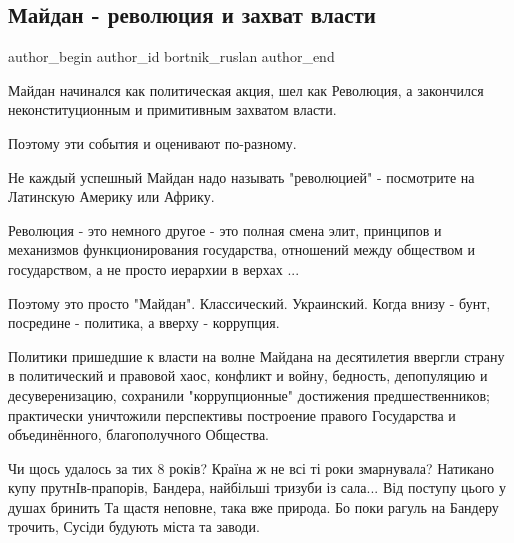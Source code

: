 
 
 
 
 
 
\subsection{Майдан - революция и захват власти}
\label{sec:21_11_2021.fb.bortnik_ruslan.1.maidan_revolucia_zahvat_vlasti}
 
\ifcmt
 author_begin
   author_id bortnik_ruslan
 author_end
\fi

Майдан начинался как политическая акция, шел как Революция, а закончился
неконституционным и примитивным захватом власти. 

Поэтому эти события и оценивают по-разному.  

Не каждый успешный Майдан надо называть "революцией" - посмотрите на Латинскую
Америку или Африку.

Революция - это немного другое - это полная смена элит, принципов и механизмов
функционирования государства, отношений между обществом и государством, а не
просто иерархии в верхах ...

Поэтому это просто "Майдан". Классический. Украинский. Когда внизу - бунт,
посредине  - политика, а вверху - коррупция. 

Политики пришедшие к власти на волне Майдана на десятилетия ввергли страну в
политический  и правовой хаос, конфликт и войну, бедность, депопуляцию и
десуверенизацию, сохранили "коррупционные" достижения предшественников;
практически уничтожили перспективы построение правого Государства и
объединённого, благополучного Общества.

\begin{cmtfront}

\begin{multicols}{2}
\obeycr
Чи щось удалось за тих 8 років?
Країна ж не всі ті роки змарнувала?
Натикано купу прутнІв-прапорів,
Бандера, найбільші тризуби із сала...
\smallskip
Від поступу цього у душах бринить
Та щастя неповне, така вже природа.
Бо поки рагуль на Бандеру трочить,
Сусіди будують міста та заводи.
\restorecr
\end{multicols}
	
\end{cmtfront}

